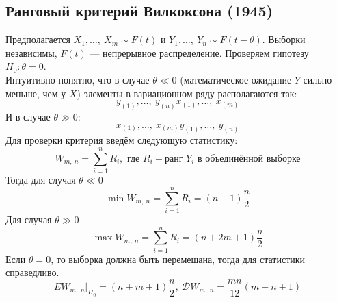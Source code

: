 \documentclass[12pt, a4paper]{article}
\newcommand{\dev}{\mathcal{D}}
\begin{document}
\subsection*{Ранговый критерий Вилкоксона (1945)}
Предполагается $X_1,\dots,\ X_m \sim F(t)$ и $Y_1,\dots,\ Y_n \sim F(t - \theta)$. Выборки независимы, $F(t)$ --- непрерывное распределение. Проверяем гипотезу $H_0: \theta = 0$.\\
Интуитивно понятно, что в случае $\theta \ll 0$ (математическое ожидание $Y$ сильно меньше, чем у $X$) элементы в вариационном ряду располагаются так:
\[y_{(1)},\dots,\ y_{(n)} x_{(1)},\dots,\ x_{(m)}\]
И в случае $\theta \gg 0$:
\[x_{(1)},\dots,\ x_{(m)} y_{(1)},\dots,\ y_{(n)}\]
Для проверки критерия введём следующую статистику:
\[W_{m,\ n} = \sum_{i = 1}^{n} R_{i},\text{ где }R_i-\text{ранг $Y_{i}$ в объединённой выборке}\]
Тогда для случая $\theta \ll 0$
\[\min W_{m,\ n} = \sum_{i = 1}^{n} R_i = (n + 1)\frac{n}{2}\]
Для случая $\theta \gg 0$
\[\max W_{m,\ n} = \sum_{i = 1}^{n} R_i = (n + 2m + 1)\frac{n}{2}\]
Если $\theta = 0$, то выборка должна быть перемешана, тогда для статистики справедливо.
\[EW_{m,\ n}\big|_{H_0} = (n + m + 1)\frac{n}{2},\ \dev W_{m,\ n} = \frac{mn}{12}(m + n + 1)\]
\end{document}
